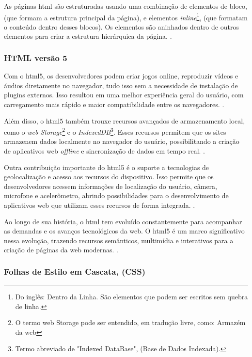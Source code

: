As páginas
\acrshort{html}
são estruturadas usando uma combinação de elementos de bloco,
(que formam a estrutura principal da página), e elementos
\textit{inline}\footnote{Do inglês: Dentro da Linha. São elementos que podem ser escritos sem quebra de linha.
},
(que formatam o conteúdo
dentro desses blocos). Os elementos são aninhados dentro de outros elementos para criar a
estrutura hierárquica da página.
\cite{w3c}.

\subsubsection{HTML versão 5}

Com o
\acrshort{html}5,
os desenvolvedores podem criar jogos online, reproduzir vídeos e
áudios diretamente no navegador, tudo isso sem a necessidade de instalação de plugins
externos. Isso resultou em uma melhor experiência geral do usuário, com carregamento mais
rápido e maior compatibilidade entre os navegadores.
\cite{w3c}.

Além disso, o
\acrshort{html}5
também trouxe recursos avançados de armazenamento local,
como o
\textit{\acrshort{web} Storage}\footnote{O termo
    \acrshort{web} Storage pode ser entendido, em tradução
    livre, como: Armazém da \acrshort{web}
}
e o
\textit{IndexedDB}\footnote{Termo abreviado de "Indexed DataBase", (Base de Dados Indexada).
}.
Esses recursos permitem que os sites armazenem dados
localmente no navegador do usuário, possibilitando a criação de aplicativos web
\textit{offline}
e
sincronização de dados em tempo real.
\cite{w3c}.

Outra contribuição importante do
\acrshort{html}5
é o suporte a tecnologias de
geolocalização e acesso aos recursos do dispositivo. Isso permite que os desenvolvedores
acessem informações de localização do usuário, câmera, microfone e acelerômetro, abrindo
possibilidades para o desenvolvimento de aplicativos web que utilizam esses recursos de
forma integrada.
\cite{w3c}.

Ao longo de sua história, o
\acrshort{html}
tem evoluído constantemente para acompanhar as
demandas e os avanços tecnológicos da web. O
\acrshort{html}5
é um marco significativo nessa
evolução, trazendo recursos semânticos, multimídia e interativos para a criação de páginas da
web modernas.
\cite{w3c}.

\subsubsection{Folhas de Estilo em Cascata, (CSS)}

